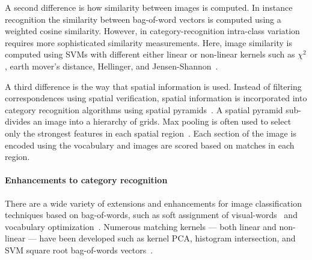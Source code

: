         A second difference is how similarity between images is computed. In instance recognition the similarity
        between bag-of-word vectors is computed using a weighted cosine similarity. However, in
        category-recognition intra-class variation requires more sophisticated similarity measurements. Here, image
        similarity is computed using SVMs with different either linear or non-linear kernels such as $\chi^2$,
        earth mover's distance, Hellinger, and Jensen-Shannon~\cite{zhang_local_2006, varma_learning_2007,
        vedaldi_efficient_2012}.

        A third difference is the way that spatial information is used. Instead of filtering correspondences using
        spatial verification, spatial information is incorporated into category recognition algorithms using
        spatial pyramids~\cite{grauman_pyramid_2005, lazebnik_beyond_2006}. A spatial pyramid sub-divides an image
        into a hierarchy of grids. Max pooling is often used to select only the strongest features in each spatial
        region~\cite{boureau_theoretical_2010, boureau_learning_2010}. Each section of the image is encoded using
        the vocabulary and images are scored based on matches in each region.

        \paragraph{Enhancements to category recognition}
        There are a wide variety of extensions and enhancements for image classification techniques based on
        bag-of-words, such as soft assignment of visual-words~\cite{liu_defense_2011} and vocabulary
        optimization~\cite{wang_locality_constrained_2010}. Numerous matching kernels --- both linear and
        non-linear --- have been developed such as kernel PCA, histogram intersection, and SVM square root
        bag-of-words vectors~\cite{vedaldi_multiple_2009, maji_classification_2008, perronnin_large_scale_2010}.

